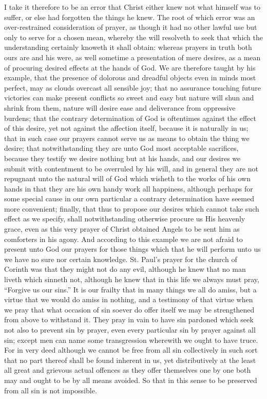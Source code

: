 I take it therefore to be an error that Christ either knew not what himself was to suffer, or else had forgotten the things he knew. The root of which error was an over-restrained consideration of prayer, as though it had no other lawful use but only to serve for a chosen mean, whereby the will resolveth to seek that which the understanding certainly knoweth it shall obtain: whereas prayers in truth both ours are and his were, as well sometime a presentation of mere desires, as a mean of procuring desired effects at the hands of God. We are therefore taught by his example, that the presence of dolorous and dreadful objects even in minds most perfect, may as clouds overcast all sensible joy; that no  assurance touching future victories can make present conflicts so sweet and easy but nature will shun and shrink from them, nature will desire ease and deliverance from oppressive burdens; that the contrary determination of God is oftentimes against the effect of this desire, yet not against the affection itself, because it is naturally in us; that in such case our prayers cannot serve us as means to obtain the thing we desire; that notwithstanding they are unto God most acceptable sacrifices, because they testify we desire nothing but at his hands, and our desires we submit with contentment to be overruled by his will, and in general they are not repugnant unto the natural will of God which wisheth to the works of his own hands in that they are his own handy work all happiness, although perhaps for some special cause in our own particular a contrary determination have seemed more convenient; finally, that thus to propose our desires which cannot take such effect as we specify, shall notwithstanding otherwise procure us His heavenly grace, even as this very prayer of Christ obtained Angels to be sent him as comforters in his agony. And according to this example we are not afraid to present unto God our prayers for those things which that he will perform unto us we have no sure nor certain knowledge.
St. Paul’s prayer for the church of Corinth was that they might not do any evil, although he knew that no man liveth which sinneth not, although he knew that in this life we always must pray, “Forgive us our sins.” It is our frailty that in many things we all do amiss, but a virtue that we would do amiss in nothing, and a testimony of that virtue when we pray that what occasion of sin soever do offer itself we may be strengthened from above to withstand it. They pray in vain to have sin pardoned which seek not also to prevent sin by prayer, even every particular sin by prayer against all sin; except men can name some transgression wherewith we ought to have truce. For in very deed although we cannot be free from all sin collectively in such sort that no part thereof shall be found inherent in us, yet distributively at the least all great and grievous actual offences as they offer themselves  one by one both may and ought to be by all means avoided. So that in this sense to be preserved from all sin is not impossible.
